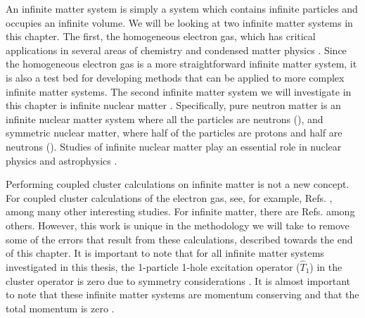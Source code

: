 An infinite matter system is simply a system which contains infinite particles and occupies an infinite volume. We will be looking at two infinite matter systems in this chapter. The first, the homogeneous electron gas, which has critical applications in several areas of chemistry and condensed matter physics \cite{Ref1, Ref2, Ref66, Ref67, Ref68, Ref72,Ref88,Ref90,Ref91,Ref92,Ref95}. Since the homogeneous electron gas is a more straightforward infinite matter system, it is also a test bed for developing methods that can be applied to more complex infinite matter systems. The second infinite matter system we will investigate in this chapter is infinite nuclear matter \cite{Ref103, Ref118,Ref120,Ref8,Ref68}. Specifically, pure neutron matter is an infinite nuclear matter system where all the particles are neutrons (\cite{Ref131,Ref39,Ref45,Ref54,Ref55,Ref56,Ref57,Ref62,Ref82}), and symmetric nuclear matter, where half of the particles are protons and half are neutrons (\cite{Ref50,Ref85}). Studies of infinite nuclear matter play an essential role in nuclear physics and astrophysics \cite{Ref108, Ref3, Ref20,Ref28,Ref33,Ref34,Ref35,Ref36,Ref37,Ref38,Ref39,Ref41,Ref58}.

Performing coupled cluster calculations on infinite matter is not a new concept. For coupled cluster calculations of the electron gas, see, for example, Refs. \cite{Ref4,Ref5,Ref2,Ref72}, among many other interesting studies. For infinite matter, there are Refs. \cite{Ref4,Ref5,Ref8,Ref9,Ref20} among others.  However, this work is unique in the methodology we will take to remove some of the errors that result from these calculations, described towards the end of this chapter. It is important to note that for all infinite matter systems investigated in this thesis, the 1-particle 1-hole excitation operator ($\hat{T}_1$) in the cluster operator is zero due to symmetry considerations \cite{Ref8}. It is almost important to note that these infinite matter systems are momentum conserving and that the total momentum is zero \cite{Ref8}.